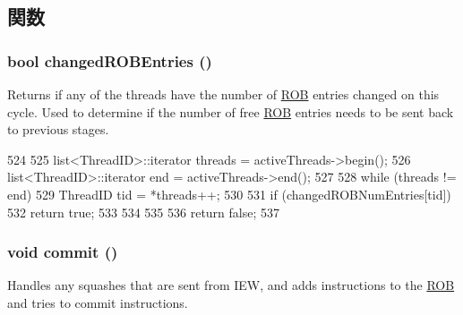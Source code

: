 \subsection{関数}
\hypertarget{classDefaultCommit_ac5a2190cdc184d1396bee3a6d99e34e7}{
\subsubsection[{changedROBEntries}]{\setlength{\rightskip}{0pt plus 5cm}bool changedROBEntries ()}}
\label{classDefaultCommit_ac5a2190cdc184d1396bee3a6d99e34e7}
Returns if any of the threads have the number of \hyperlink{classROB}{ROB} entries changed on this cycle. Used to determine if the number of free \hyperlink{classROB}{ROB} entries needs to be sent back to previous stages. 


\begin{DoxyCode}
524 {
525     list<ThreadID>::iterator threads = activeThreads->begin();
526     list<ThreadID>::iterator end = activeThreads->end();
527 
528     while (threads != end) {
529         ThreadID tid = *threads++;
530 
531         if (changedROBNumEntries[tid]) {
532             return true;
533         }
534     }
535 
536     return false;
537 }
\end{DoxyCode}
\hypertarget{classDefaultCommit_ad55316f5135cdae6aa6c5a763f6c3473}{
\subsubsection[{commit}]{\setlength{\rightskip}{0pt plus 5cm}void commit ()}}
\label{classDefaultCommit_ad55316f5135cdae6aa6c5a763f6c3473}
Handles any squashes that are sent from IEW, and adds instructions to the \hyperlink{classROB}{ROB} and tries to commit instructions. 


